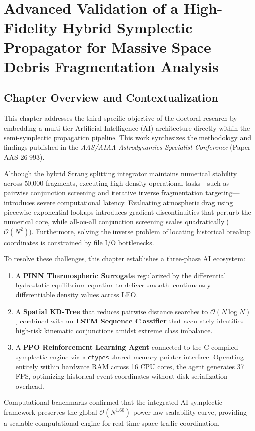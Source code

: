 \documentclass[12pt,letterpaper,twoside]{book}
\begin{document}
\cleardoublepage

\chapter{Advanced Validation of a High-Fidelity Hybrid Symplectic Propagator for Massive Space Debris Fragmentation Analysis}
\label{ch:paper3}

\section*{Chapter Overview and Contextualization}
This chapter addresses the third specific objective of the doctoral research by embedding a multi-tier Artificial Intelligence (AI) architecture directly within the semi-symplectic propagation pipeline. This work synthesizes the methodology and findings published in the \textit{AAS/AIAA Astrodynamics Specialist Conference} (Paper AAS 26-993).

Although the hybrid Strang splitting integrator maintains numerical stability across 50,000 fragments, executing high-density operational tasks---such as pairwise conjunction screening and iterative inverse fragmentation targeting---introduces severe computational latency. Evaluating atmospheric drag using piecewise-exponential lookups introduces gradient discontinuities that perturb the numerical core, while all-on-all conjunction screening scales quadratically ($\mathcal{O}(N^2)$). Furthermore, solving the inverse problem of locating historical breakup coordinates is constrained by file I/O bottlenecks.

To resolve these challenges, this chapter establishes a three-phase AI ecosystem:
\begin{enumerate}
    \item A \textbf{PINN Thermospheric Surrogate} regularized by the differential hydrostatic equilibrium equation to deliver smooth, continuously differentiable density values across LEO.
    \item A \textbf{Spatial KD-Tree} that reduces pairwise distance searches to $\mathcal{O}(N \log N)$, combined with an \textbf{LSTM Sequence Classifier} that accurately identifies high-risk kinematic conjunctions amidst extreme class imbalance.
    \item A \textbf{PPO Reinforcement Learning Agent} connected to the C-compiled symplectic engine via a \texttt{ctypes} shared-memory pointer interface. Operating entirely within hardware RAM across 16 CPU cores, the agent generates 37 FPS, optimizing historical event coordinates without disk serialization overhead.
\end{enumerate}
Computational benchmarks confirmed that the integrated AI-symplectic framework preserves the global $\mathcal{O}(N^{1.60})$ power-law scalability curve, providing a scalable computational engine for real-time space traffic coordination.
\end{document}
